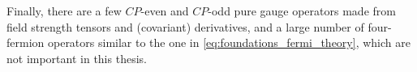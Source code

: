 Finally, there are a few $CP$-even and $CP$-odd pure gauge operators
made from field strength tensors and (covariant) derivatives, and a
large number of four-fermion operators similar to the one in
\autoref{eq:foundations_fermi_theory}, which are not important in this
thesis.




